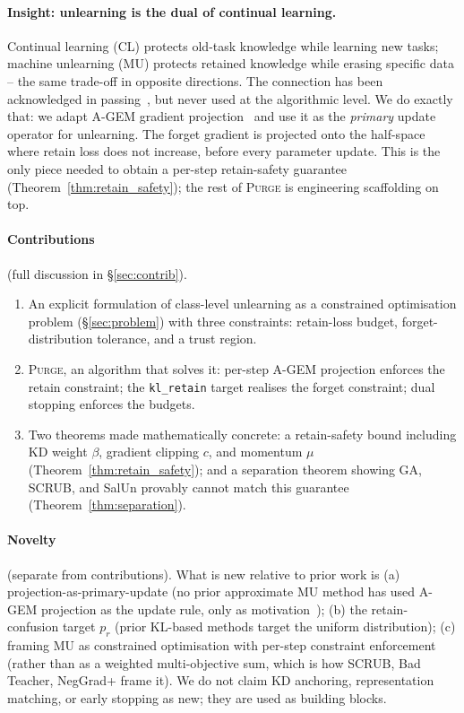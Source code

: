 \documentclass{article}
\newcommand{\ours}{\textsc{Purge}}
\newcommand{\klr}{\texttt{kl\_retain}}
\begin{document}
{\paragraph{Insight: unlearning is the dual of continual learning.}
Continual learning (CL) protects old-task knowledge while learning new tasks; machine unlearning (MU) protects retained knowledge while erasing specific data -- the same trade-off in opposite directions. The connection has been acknowledged in passing~\cite{kurmanji2023unbounded,nguyen2020variational}, but never used at the algorithmic level. We do exactly that: we adapt A-GEM gradient projection~\cite{chaudhry2019agem} and use it as the \emph{primary} update operator for unlearning. The forget gradient is projected onto the half-space where retain loss does not increase, before every parameter update. This is the only piece needed to obtain a per-step retain-safety guarantee (Theorem~\ref{thm:retain_safety}); the rest of \ours{} is engineering scaffolding on top.

\paragraph{Contributions} (full discussion in \S\ref{sec:contrib}).
\begin{enumerate}[nosep,leftmargin=*]
\item An explicit formulation of class-level unlearning as a constrained optimisation problem (\S\ref{sec:problem}) with three constraints: retain-loss budget, forget-distribution tolerance, and a trust region.
\item \ours{}, an algorithm that solves it: per-step A-GEM projection enforces the retain constraint; the \klr{} target realises the forget constraint; dual stopping enforces the budgets.
\item Two theorems made mathematically concrete: a retain-safety bound including KD weight $\beta$, gradient clipping $c$, and momentum $\mu$ (Theorem~\ref{thm:retain_safety}); and a separation theorem showing GA, SCRUB, and SalUn provably cannot match this guarantee (Theorem~\ref{thm:separation}).
\end{enumerate}

\paragraph{Novelty} (separate from contributions). What is new relative to prior work is (a) projection-as-primary-update (no prior approximate MU method has used A-GEM projection as the update rule, only as motivation~\cite{kurmanji2023unbounded}); (b) the retain-confusion target $p_r$ (prior KL-based methods target the uniform distribution); (c) framing MU as constrained optimisation with per-step constraint enforcement (rather than as a weighted multi-objective sum, which is how SCRUB, Bad Teacher, NegGrad+ frame it). We do not claim KD anchoring, representation matching, or early stopping as new; they are used as building blocks.

}
\end{document}
